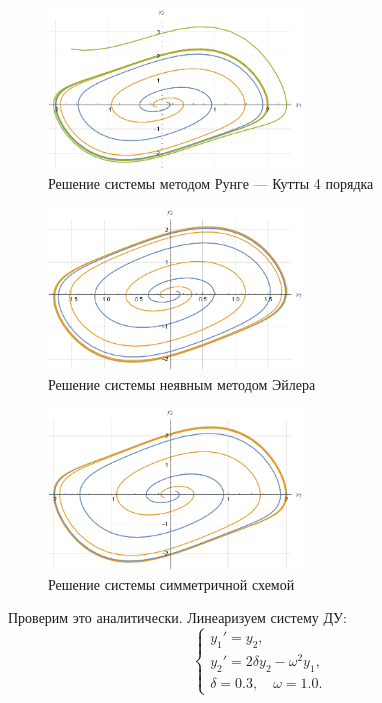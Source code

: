 \documentclass[12pt, a4paper]{article}
\begin{document}
	\begin{figure}[!h]
		\centering
		\includegraphics[width=0.6\textwidth]{part4_rk4}
		\caption{Решение системы методом Рунге --- Кутты 4 порядка}
		\label{part4_rk4}
	\end{figure}
	
	\begin{figure}[!h]
		\centering
		\includegraphics[width=0.6\textwidth]{part4_euler_impl}
		\caption{Решение системы неявным методом Эйлера}
		\label{part4_euler_impl}
	\end{figure}
	
	\begin{figure}[!h]
		\centering
		\includegraphics[width=0.6\textwidth]{part4_symm}
		\caption{Решение системы симметричной схемой}
		\label{part4_symm}
	\end{figure}
	
	Проверим это аналитически. Линеаризуем систему ДУ:
	\begin{equation*}
		\begin{cases}
			y_1' = y_2, \\
			y_2' = 2\delta y_2 - \omega^2 y_1, \\
			\delta = 0.3, \quad \omega = 1.0.
		\end{cases}
	\end{equation*}
	
\end{document}
